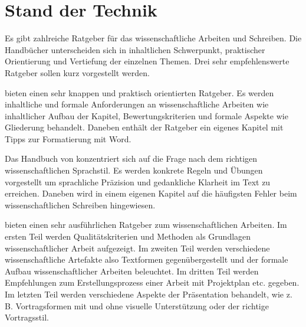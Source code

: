 \chapter{Stand der Technik}\label{sec:stand_der_technik}

Es gibt zahlreiche Ratgeber für das wissenschaftliche Arbeiten und Schreiben. Die Handbücher unterscheiden sich in inhaltlichen Schwerpunkt, praktischer Orientierung und Vertiefung der einzelnen Themen. Drei sehr empfehlenswerte Ratgeber sollen kurz vorgestellt werden.

\cite{karmasin2012gestaltung} bieten einen sehr knappen und praktisch orientierten Ratgeber. Es werden inhaltliche und formale Anforderungen an wissenschaftliche Arbeiten wie inhaltlicher Aufbau der Kapitel, Bewertungskriterien und formale Aspekte wie Gliederung behandelt. Daneben enthält der Ratgeber ein eigenes Kapitel mit Tipps zur Formatierung mit Word.

Das Handbuch von \cite{esselborn2012richtig} konzentriert sich auf die Frage nach dem richtigen wissenschaftlichen Sprachstil. Es werden konkrete Regeln und Übungen vorgestellt um sprachliche Präzision und gedankliche Klarheit im Text zu erreichen. Daneben wird in einem eigenen Kapitel auf die häufigsten Fehler beim wissenschaftlichen Schreiben hingewiesen.

\cite{balzert2011wissenschaftliches} bieten einen sehr ausführlichen Ratgeber zum wissenschaftlichen Arbeiten. Im ersten Teil werden Qualitätskriterien und Methoden als Grundlagen wissenschaftlicher Arbeit aufgezeigt. Im zweiten Teil werden verschiedene wissenschaftliche Artefakte also Textformen gegenübergestellt und der formale Aufbau wissenschaftlicher Arbeiten beleuchtet. Im dritten Teil werden Empfehlungen zum Erstellungsprozess einer Arbeit mit Projektplan etc. gegeben. Im letzten Teil werden verschiedene Aspekte der Präsentation behandelt, wie z. B. Vortragsformen mit und ohne visuelle Unterstützung oder der richtige Vortragsstil.
